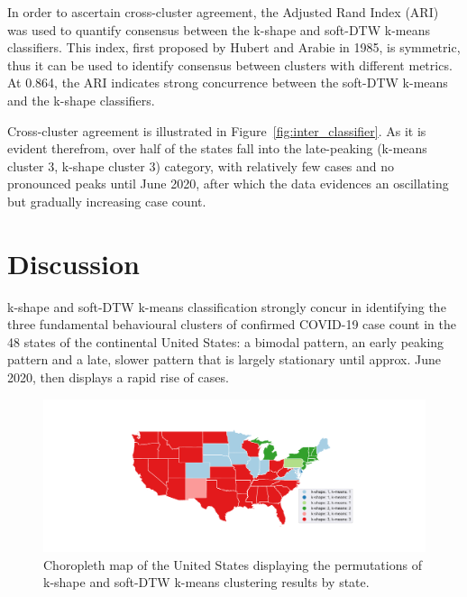 \documentclass{article}
\begin{document}
In order to ascertain cross-cluster agreement, the Adjusted Rand Index (ARI) was used to quantify consensus between the k-shape and soft-DTW k-means classifiers.\cite{hubert1985comparing} This index, first proposed by Hubert and Arabie in 1985, is symmetric, thus it can be used to identify consensus between clusters with different metrics. At 0.864, the ARI indicates strong concurrence between the soft-DTW k-means and the k-shape classifiers.

Cross-cluster agreement is illustrated in Figure~\ref{fig:inter_classifier}. As it is evident therefrom, over half of the states fall into the late-peaking (k-means cluster 3, k-shape cluster 3) category, with relatively few cases and no pronounced peaks until June 2020, after which the data evidences an oscillating but gradually increasing case count. 



\section{Discussion} %
\label{sec:discussion}

k-shape and soft-DTW k-means classification strongly concur in identifying the three fundamental behavioural clusters of confirmed COVID-19 case count in the 48 states of the continental United States: a bimodal pattern, an early peaking pattern and a late, slower pattern that is largely stationary until approx. June 2020, then displays a rapid rise of cases.

\begin{figure}
	\includegraphics[width=\linewidth]{figures/branch_choropleth}
	\centering
	\caption{Choropleth map of the United States displaying the permutations of k-shape and soft-DTW k-means clustering results by state.}
	\label{fig:choropleth}
\end{figure}
\end{document}
